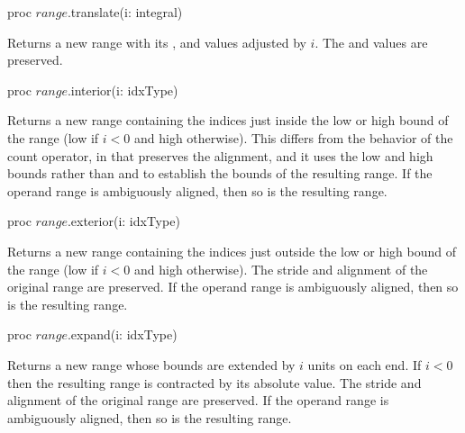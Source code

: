 \begin{protohead}
proc $range$.translate(i: integral)
\end{protohead}
\begin{protobody}
Returns a new range with its ,  and  values
adjusted by $i$.  The  and  values are preserved.
\end{protobody}

\begin{protohead}
proc $range$.interior(i: idxType)
\end{protohead}
\begin{protobody}
Returns a new range containing the indices just inside the low or high bound of
the range (low if $i < 0$ and high otherwise).
This differs from the behavior of the count operator, in that 
preserves the alignment, and it uses the low and high bounds rather
than  and  to establish the bounds of the resulting range.
If the operand range is ambiguously aligned, then so is the resulting range.
\end{protobody}

\begin{protohead}
proc $range$.exterior(i: idxType)
\end{protohead}
\begin{protobody}
Returns a new range containing the indices just outside the low or high bound of
the range (low if $i < 0$ and high otherwise).  The stride and alignment of the
original range are preserved.
If the operand range is ambiguously aligned, then so is the resulting range.
\end{protobody}

\begin{protohead}
proc $range$.expand(i: idxType)
\end{protohead}
\begin{protobody}
Returns a new range whose bounds are extended by $i$ units on each end.  If $i <
0$ then the resulting range is contracted by its absolute value.
The stride and alignment of the original range are preserved.
If the operand range is ambiguously aligned, then so is the resulting range.
\end{protobody}

\begin{protohead}
\end{protohead}
\begin{protobody}
\end{protobody}

